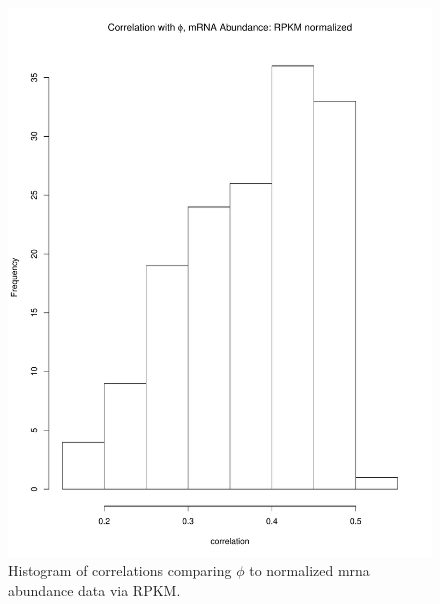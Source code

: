 \documentclass[11pt]{labbook}
\begin{document}
\begin{figure}[H]
\centering
\includegraphics[page=1,scale=0.6]{Ecoli_REL606/correlation_ppr_mrna_rpkm.pdf}
\caption{Histogram of correlations comparing $\phi$ to normalized mrna abundance data via RPKM.}
\end{figure}
\end{document}
